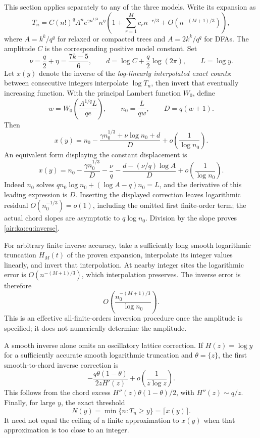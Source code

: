 \documentclass[11pt,letterpaper]{article}
\numberwithin{equation}{section}
\theoremstyle{remark}
\begin{document}
This section applies separately to any of the three models. Write its expansion as
\[
 T_n=C(n!)^q A^n e^{\gamma n^{1/3}}n^\eta
 \left(1+\sum_{r=1}^Mc_rn^{-r/3}+O(n^{-(M+1)/3})\right),
\]
where $A=k^k/q^q$ for relaxed or compacted trees and $A=2k^k/q^q$ for DFAs. The amplitude $C$ is the corresponding positive model constant. Set
\[
 \nu=\frac q2+\eta=\frac{7k-5}{6},\qquad
 d=\log C+\frac q2\log(2\pi),\qquad L=\log y.
\]
Let $x(y)$ denote the inverse of the \emph{log-linearly interpolated exact counts}: between consecutive integers interpolate $\log T_n$, then invert that eventually increasing function. With the principal Lambert function $W_0$, define
\[
 w=W_0\left(\frac{A^{1/q}L}{qe}\right),\qquad
 n_0=\frac{L}{qw},\qquad D=q(w+1).
\]
Then
\begin{equation}\label{air:ka:eq:inverse}
 x(y)=n_0-\frac{\gamma n_0^{1/3}+\nu\log n_0+d}{D}
 +o\left(\frac1{\log n_0}\right).
\end{equation}
An equivalent form displaying the constant displacement is
\[
 x(y)=n_0-\frac{\gamma n_0^{1/3}}D-\frac\nu q
 -\frac{d-(\nu/q)\log A}{D}
 +o\left(\frac1{\log n_0}\right).
\]
Indeed $n_0$ solves $qn_0\log n_0+(\log A-q)n_0=L$, and the derivative of this leading expression is $D$. Inserting the displayed correction leaves logarithmic residual $O(n_0^{-1/3})=o(1)$, including the omitted first finite-order term; the actual chord slopes are asymptotic to $q\log n_0$. Division by the slope proves \eqref{air:ka:eq:inverse}.

For arbitrary finite inverse accuracy, take a sufficiently long smooth logarithmic truncation $H_M(t)$ of the proven expansion, interpolate its integer values linearly, and invert that interpolation. At nearby integer sites the logarithmic error is $O(n^{-(M+1)/3})$, which interpolation preserves. The inverse error is therefore
\[
 O\left(\frac{n_0^{-(M+1)/3}}{\log n_0}\right).
\]
This is an effective all-finite-orders inversion procedure once the amplitude is specified; it does not numerically determine the amplitude.

A smooth inverse alone omits an oscillatory lattice correction. If $H(z)=\log y$ for a sufficiently accurate smooth logarithmic truncation and $\theta=\{z\}$, the first smooth-to-chord inverse correction is
\[
 -\frac{q\theta(1-\theta)}{2zH'(z)}
 +o\left(\frac1{z\log z}\right).
\]
This follows from the chord excess $H''(z)\theta(1-\theta)/2$, with $H''(z)\sim q/z$. Finally, for large $y$, the exact threshold
\[
 N(y)=\min\{n:T_n\ge y\}=\lceil x(y)\rceil.
\]
It need not equal the ceiling of a finite approximation to $x(y)$ when that approximation is too close to an integer.
\end{document}

